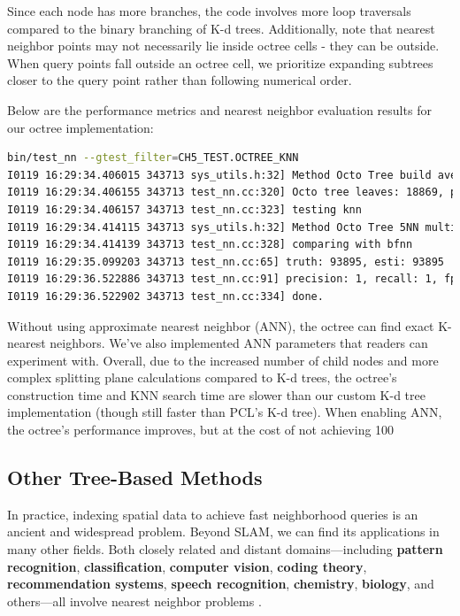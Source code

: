 Since each node has more branches, the code involves more loop traversals compared to the binary branching of K-d trees. Additionally, note that nearest neighbor points may not necessarily lie inside octree cells - they can be outside. When query points fall outside an octree cell, we prioritize expanding subtrees closer to the query point rather than following numerical order.

Below are the performance metrics and nearest neighbor evaluation results for our octree implementation:

\begin{lstlisting}[language=sh, caption=Terminal output:]
bin/test_nn --gtest_filter=CH5_TEST.OCTREE_KNN 
I0119 16:29:34.406015 343713 sys_utils.h:32] Method Octo Tree build average call time/count: 18.802/1 ms.
I0119 16:29:34.406155 343713 test_nn.cc:320] Octo tree leaves: 18869, points: 18869
I0119 16:29:34.406157 343713 test_nn.cc:323] testing knn
I0119 16:29:34.414115 343713 sys_utils.h:32] Method Octo Tree 5NN multithreaded average call time/count: 7.95114/1 ms.
I0119 16:29:34.414139 343713 test_nn.cc:328] comparing with bfnn
I0119 16:29:35.099203 343713 test_nn.cc:65] truth: 93895, esti: 93895
I0119 16:29:36.522886 343713 test_nn.cc:91] precision: 1, recall: 1, fp: 0, fn: 0
I0119 16:29:36.522902 343713 test_nn.cc:334] done.
\end{lstlisting}

Without using approximate nearest neighbor (ANN), the octree can find exact K-nearest neighbors. We've also implemented ANN parameters that readers can experiment with. Overall, due to the increased number of child nodes and more complex splitting plane calculations compared to K-d trees, the octree's construction time and KNN search time are slower than our custom K-d tree implementation (though still faster than PCL's K-d tree). When enabling ANN, the octree's performance improves, but at the cost of not achieving 100%

\subsection{Other Tree-Based Methods}
In practice, indexing spatial data to achieve fast neighborhood queries is an ancient and widespread problem. Beyond SLAM, we can find its applications in many other fields. Both closely related and distant domains—including \textbf{pattern recognition}, \textbf{classification}, \textbf{computer vision}, \textbf{coding theory}, \textbf{recommendation systems}, \textbf{speech recognition}, \textbf{chemistry}, \textbf{biology}, and others—all involve nearest neighbor problems \cite{Haining2003}.  

